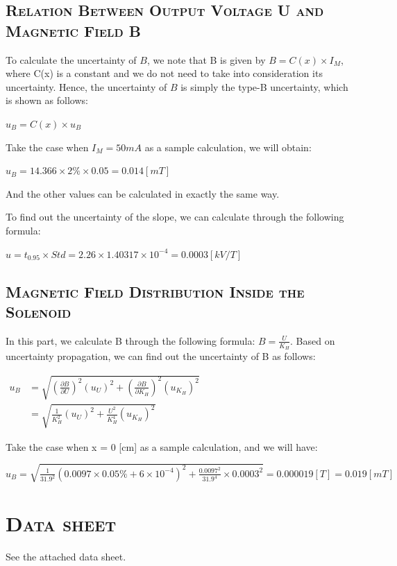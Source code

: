 \documentclass[a4paper,12pt]{article}
\begin{document}
\begin{appendices}
\subsection{\textsc{Relation Between Output Voltage U and Magnetic Field B}}
To calculate the uncertainty of $B$, we note that B is given by $B = C(x) \times I_M$, where C(x) is a constant and we do not need to take into consideration its uncertainty. Hence, the uncertainty of $B$ is simply the type-B uncertainty, which is shown as follows:
\begin{center}
$u_B = C(x) \times u_B$
\end{center}
Take the case when $I_M = 50 mA $ as a sample calculation, we will obtain:
\begin{center}
$u_B = 14.366 \times 2\% \times 0.05 = 0.014 [mT]$
\end{center}
And the other values can be calculated in exactly the same way.
\par To find out the uncertainty of the slope, we can calculate through the following formula:
\begin{center}
$ u = t_{0.95} \times Std = 2.26 \times 1.40317 \times 10^{-4} = 0.0003 [kV/T] $ 
\end{center}

\subsection{\textsc{Magnetic Field Distribution Inside the Solenoid}}
In this part, we calculate B through the following formula: $B = \frac{U}{K_H}$. Based on uncertainty propagation, we can find out the uncertainty of B as follows:
\begin{center}
$
\begin{aligned}
u_B &= \sqrt{(\frac{\partial B}{\partial U})^2(u_U)^2 + (\frac{\partial B}{\partial K_H})^2(u_{K_H})^2}\\
		&= \sqrt{\frac{1}{K_H^2}(u_U)^2 + \frac{U^2}{K_H^4}(u_{K_H})^2}
\end{aligned}
 $
\end{center}
Take the case when x = 0 [cm] as a sample calculation, and we will have:
\begin{center}
$\displaystyle  u_B = \sqrt{\frac{1}{31.9^2}(0.0097\times 0.05\% + 6\times 10^{-4})^2 + \frac{0.0097^2}{31.9^4}\times 0.0003^2} = 0.000019 [T] = 0.019 [mT]$
\end{center}

\section{\textsc{Data sheet}} 
See the attached data sheet.
\end{appendices} 
\end{document}
